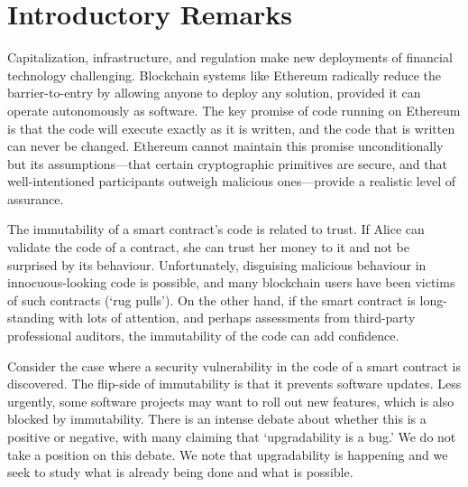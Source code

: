 

\section{Introductory Remarks}

Capitalization, infrastructure, and regulation make new deployments of financial technology challenging. Blockchain systems like Ethereum radically reduce the barrier-to-entry by allowing anyone to deploy any solution, provided it can operate autonomously as software. The key promise of code running on Ethereum is that the code will execute exactly as it is written, and the code that is written can never be changed. Ethereum cannot maintain this promise unconditionally but its assumptions---that certain cryptographic primitives are secure, and that well-intentioned participants outweigh malicious ones---provide a realistic level of assurance. 

The immutability of a smart contract's code is related to trust. If Alice can validate the code of a contract, she can trust her money to it and not be surprised by its behaviour. Unfortunately, disguising malicious behaviour in innocuous-looking code is possible, and many blockchain users have been victims of such contracts (`rug pulls'). On the other hand, if the smart contract is long-standing with lots of attention, and perhaps assessments from third-party professional auditors, the immutability of the code can add confidence. 

Consider the case where a security vulnerability in the code of a smart contract is discovered. The flip-side of immutability is that it prevents software updates. Less urgently, some software projects may want to roll out new features, which is also blocked by immutability. There is an intense debate about whether this is a positive or negative, with many claiming that `upgradability is a bug.' We do not take a position on this debate. We note that upgradability is happening and we seek to study what is already being done and what is possible. 

